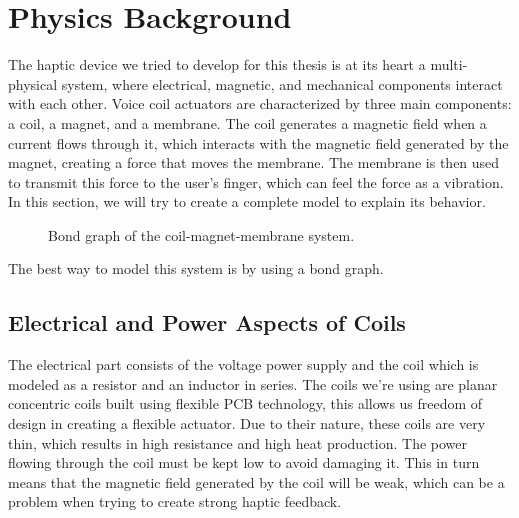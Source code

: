 \section{Physics Background}
The haptic device we tried to develop for this thesis is at its heart a multi-physical system, where electrical, magnetic, and mechanical components interact with each other.
Voice coil actuators are characterized by three main components: a coil, a magnet, and a membrane. The coil generates a magnetic field when a current flows through it, which interacts with the magnetic field generated by the magnet, creating a force that moves the membrane. The membrane is then used to transmit this force to the user's finger, which can feel the force as a vibration.
In this section, we will try to create a complete model to explain its behavior.
\begin{figure}[H]
    \centering
    \resizebox{1\linewidth}{!}{
        
    } %
    \caption{Bond graph of the coil-magnet-membrane system.}
    \label{fig: Total_bond-graph}
\end{figure}
The best way to model this system is by using a bond graph.

\subsection{Electrical and Power Aspects of Coils}
The electrical part consists of the voltage power supply and the coil which is modeled as a resistor and an inductor in series. The coils we're using are planar concentric coils built using flexible PCB technology, this allows us freedom of design in creating a flexible actuator.
Due to their nature, these coils are very thin, which results in high resistance and high heat production. The power flowing through the coil must be kept low to avoid damaging it. This in turn means that the magnetic field generated by the coil will be weak, which can be a problem when trying to create strong haptic feedback.

